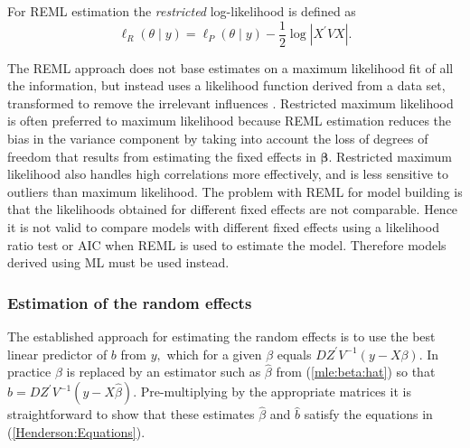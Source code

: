 \documentclass[12pt, a4paper]{report}
\theoremstyle{plain}
\theoremstyle{definition}
\theoremstyle{remark}
\begin{document}
	For REML estimation the \emph{restricted} log-likelihood is defined as
	\[
	\ell_R(\theta \mid y) =
	\ell_P(\theta \mid y) -\frac{1}{2} \log |X^\prime VX |.
	\]
	
	The REML approach does not base estimates on a maximum likelihood fit of all the information, but instead uses a likelihood function derived from a data set, transformed to remove the irrelevant influences \citep{REMLDefine}.
	Restricted maximum likelihood is often preferred to maximum likelihood because REML estimation reduces the bias in the variance component by taking into account the loss of degrees of freedom that results
	from estimating the fixed effects in $\boldsymbol{\beta}$. Restricted maximum likelihood also handles high correlations more effectively, and is less sensitive to outliers than maximum likelihood.  The problem with REML for model building is that the likelihoods obtained for different fixed effects are not comparable. Hence it is not valid to compare models with different fixed effects using a likelihood ratio test or AIC when REML is used to
	estimate the model. Therefore models derived using ML must be used instead.
	
	\subsubsection{Estimation of the random effects}
	
	The established approach for estimating the random effects is to use the best linear predictor of $b$ from $y,$ which for a given $\beta$ equals $DZ^\prime V^{-1}(y - X \beta).$ In practice $\beta$ is replaced by an estimator such as $\hat{\beta}$ from (\ref{mle:beta:hat}) so that $\hat{b} = DZ^\prime V^{-1}(y - X \hat{\beta}).$ Pre-multiplying by the appropriate matrices it is straightforward to show that these estimates $\hat{\beta}$ and $\hat{b}$ satisfy the equations in (\ref{Henderson:Equations}).
	
\end{document}
